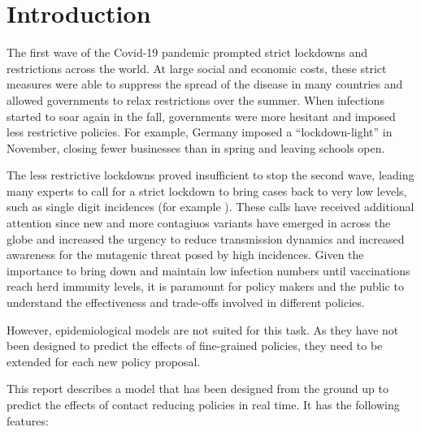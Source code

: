 \section{Introduction}
\label{sec:introduction}

The first wave of the Covid-19 pandemic prompted strict lockdowns and restrictions
across the world.
At large social and economic costs, these strict measures were able to suppress the
spread of the disease in many countries and allowed governments to relax restrictions
over the summer.
When infections started to soar again in the fall, governments were more hesitant
and imposed less restrictive policies.
For example, Germany imposed a ``lockdown-light'' in November, closing fewer businesses
than in spring and leaving schools open.

The less restrictive lockdowns proved insufficient to stop the second wave, leading
many experts to call for a strict lockdown to bring cases back to very low levels,
such as single digit incidences (for example \cite{Priesemann2021}).
These calls have received additional attention since new and more contagiuos variants
have emerged in across the globe \citep{Duong2021} and increased the urgency to
reduce transmission dynamics and increased awareness for the mutagenic threat posed by
high incidences.
Given the importance to bring down and maintain low infection numbers until
vaccinations reach herd immunity levels, it is paramount for policy makers and the
public to understand the effectiveness and trade-offs involved in different policies.

However, epidemiological models are not suited for this task.
As they have not been designed to predict the effects of fine-grained policies,
they need to be extended for each new policy proposal.

This report describes a model that has been designed from the ground up to predict the
effects of contact reducing policies in real time. It has the following features:

